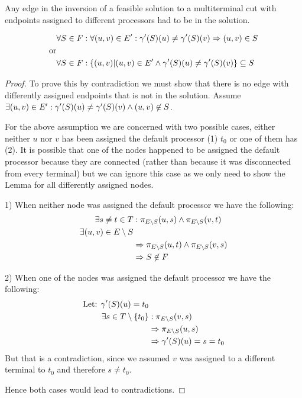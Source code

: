 \begin{lemma}
\label{INVERSESUBSET}
Any edge in the inversion of a feasible solution to a multiterminal cut with endpoints assigned to different processors had to be in the solution.

\begin{align}
	\nonumber & \forall S \in F : \forall (u, v) \in E' : \gamma'(S)(u) \neq \gamma'(S)(v) \Rightarrow (u,v) \in S \\
	\nonumber \mbox{or} &\\
	\nonumber & \forall S \in F : \{(u,v) |(u, v) \in E' \wedge \gamma'(S)(u) \neq \gamma'(S)(v)\} \subseteq S
\end{align}
\end{lemma}
\begin{proof}
To prove this by contradiction we must show that there is no edge with differently assigned endpoints that is not in the solution.
Assume $\exists (u,v) \in E' : \gamma'(S)(u) \neq \gamma'(S)(v) \wedge (u,v) \not\in S$.

For the above assumption we are concerned with two possible cases, either neither $u$ nor $v$ has been assigned the default processor (1) $t_0$ or one of them has (2).
It is possible that one of the nodes happened to be assigned the default processor because they are connected (rather than because it was disconnected from every terminal) but we can ignore this case as we only need to show the Lemma for all differently assigned nodes.

1) When neither node was assigned the default processor we have the following:
\begin{align}
	\nonumber \exists s \neq t \in T  & : \pi_{E \setminus S}(u, s) \wedge \pi_{E \setminus S}(v, t) \\
	\nonumber \exists (u, v) \in E \setminus S& \\
	\nonumber & \Rightarrow \pi_{E \setminus S}(u, t) \wedge \pi_{E \setminus S}(v, s) \\
	\nonumber & \Rightarrow S \not\in F
\end{align}

2) When one of the nodes was assigned the default processor we have the following:
\begin{align}
	\nonumber \mbox{Let: } \gamma'(S)(u) = t_0 & \\
	\nonumber \exists s \in T \setminus \{t_0\} & : \pi_{E \setminus S}(v, s) \\
	\nonumber & \Rightarrow \pi_{E \setminus S}(u, s) \\
	\nonumber & \Rightarrow \gamma'(S)(u) = s = t_0
\end{align}
But that is a contradiction, since we assumed $v$ was assigned to a different terminal to $t_0$ and therefore $s \neq t_0$.

Hence both cases would lead to contradictions.
\end{proof}

